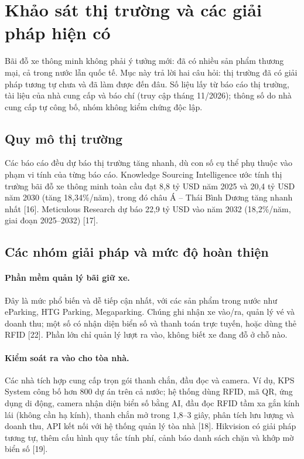 \section{Khảo sát thị trường và các giải pháp hiện có}\label{sec:thitruong}
Bãi đỗ xe thông minh không phải ý tưởng mới: đã có nhiều sản phẩm thương mại, cả trong
nước lẫn quốc tế. Mục này trả lời hai câu hỏi: thị trường đã có giải pháp tương tự chưa
và đã làm được đến đâu. Số liệu lấy từ báo cáo thị trường, tài liệu của nhà cung cấp và
báo chí (truy cập tháng 11/2026); thông số do nhà cung cấp tự công bố, nhóm không kiểm
chứng độc lập.

\subsection{Quy mô thị trường}
Các báo cáo đều dự báo thị trường tăng nhanh, dù con số cụ thể phụ thuộc vào phạm vi
tính của từng báo cáo. Knowledge Sourcing Intelligence ước tính thị trường bãi đỗ xe thông minh
toàn cầu đạt 8,8 tỷ USD năm 2025 và 20,4 tỷ USD năm 2030 (tăng 18,34\%/năm), trong đó
châu Á -- Thái Bình Dương tăng nhanh nhất [16]. Meticulous Research dự báo 22,9 tỷ USD vào năm
2032 (18,2\%/năm, giai đoạn 2025--2032) [17].

\subsection{Các nhóm giải pháp và mức độ hoàn thiện}
\paragraph{Phần mềm quản lý bãi giữ xe.} Đây là mức phổ biến và dễ tiếp cận nhất, với các
sản phẩm trong nước như eParking, HTG Parking, Megaparking. Chúng ghi nhận xe vào/ra,
quản lý vé và doanh thu; một số có nhận diện biển số và thanh toán trực tuyến, hoặc
dùng thẻ RFID [22]. Phần lớn chỉ quản lý lượt ra vào, không biết xe đang đỗ ở chỗ nào.

\paragraph{Kiểm soát ra vào cho tòa nhà.} Các nhà tích hợp cung cấp trọn gói thanh chắn,
đầu đọc và camera. Ví dụ, KPS System công bố hơn 800 dự án trên cả nước; hệ thống dùng
RFID, mã QR, ứng dụng di động, camera nhận diện biển số bằng AI, đầu đọc RFID tầm xa gắn
kính lái (không cần hạ kính), thanh chắn mở trong 1,8--3 giây, phân tích lưu lượng và doanh
thu, API kết nối với hệ thống quản lý tòa nhà [18]. Hikvision có giải pháp tương tự,
thêm cấu hình quy tắc tính phí, cảnh báo danh sách chặn và khớp mờ biển số [19].

